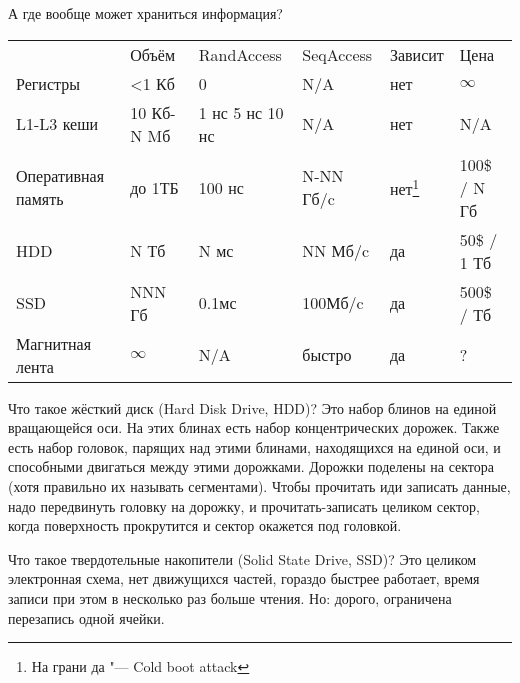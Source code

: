 А где вообще может храниться информация?
\begin{center}\begin{tabular}{l|lllll}
& Объём & RandAccess & SeqAccess & Зависит & Цена \\
Регистры           & <1 Кб      & 0               & N/A       & нет                                             & $∞$  \\
L1-L3 кеши         & 10 Кб-N Mб & 1 нс 5 нс 10 нс & N/A       & нет                                             & N/A \\
Оперативная память & до 1ТБ     & 100 нс          & N-NN Гб/c & нет\footnote{На грани да "--- Cold boot attack} & 100\$ / N Гб \\
HDD                & N Тб       & N мс            & NN Мб/c   & да                                              & 50\$ / 1 Тб \\
SSD                & NNN Гб     & 0.1мс           & 100Мб/c   & да                                              & 500\$ / Тб \\ 
Магнитная лента    & $∞$        & N/A             & быстро    & да                                              & ?
\end{tabular}\end{center}
Что такое жёсткий диск (Hard Disk Drive, HDD)?
Это набор блинов на единой вращающейся оси.
На этих блинах есть набор концентрических дорожек.
Также есть набор головок, парящих над этими блинами, находящихся на единой оси, и способными двигаться между этими дорожками.
Дорожки поделены на сектора (хотя правильно их называть сегментами).
Чтобы прочитать иди записать данные, надо передвинуть головку на дорожку, и прочитать-записать целиком сектор,
когда поверхность прокрутится и сектор окажется под головкой.

Что такое твердотельные накопители (Solid State Drive, SSD)?
Это целиком электронная схема, нет движущихся частей, гораздо быстрее работает, время записи при этом в несколько раз больше чтения.
Но: дорого, ограничена перезапись одной ячейки.
